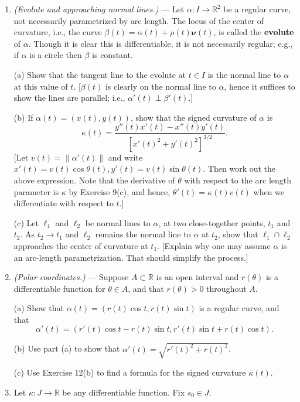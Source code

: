 \documentclass[leqno]{book}
\begin{document}
\begin{enumerate}
\item\emph{(Evolute and approaching normal lines.)} \---- Let $\alpha:I\to\mathbb R^2$ be a regular curve, not necessarily parametrized by arc length.  The locus of the center of curvature, i.e., the curve $\beta(t)=\alpha(t)+\rho(t)\boldsymbol\nu(t)$, is called the \textbf{evolute} of $\alpha$.  Though it is clear this is differentiable, it is not necessarily regular; e.g., if $\alpha$ is a circle then $\beta$ is constant. %

(a) Show that the tangent line to the evolute at $t\in I$ is the normal line to $\alpha$ at this value of $t$.  [$\beta(t)$ is clearly on the normal line to $\alpha$, hence it suffices to show the lines are parallel; i.e., $\alpha'(t)\perp\beta'(t)$.]

(b) If $\alpha(t)=(x(t),y(t))$, show that the signed curvature of $\alpha$ is
$$\kappa(t)=\frac{y''(t)x'(t)-x''(t)y'(t)}{[x'(t)^2+y'(t)^2]^{3/2}}.$$
[Let $v(t)=\|\alpha'(t)\|$ and write $x'(t)=v(t)\cos\theta(t),y'(t)=v(t)\sin\theta(t)$.  Then work out the above expression.  Note that the derivative of $\theta$ with respect to the arc length parameter is $\kappa$ by Exercise 9(c), and hence, $\theta'(t)=\kappa(t)v(t)$ when we differentiate with respect to $t$.]

(c) Let $\ell_1$ and $\ell_2$ be normal lines to $\alpha$, at two close-together points, $t_1$ and $t_2$.  As $t_2\to t_1$ and $\ell_2$ remains the normal line to $\alpha$ at $t_2$, show that $\ell_1\cap\ell_2$ approaches the center of curvature at $t_1$.  [Explain why one may assume $\alpha$ is an arc-length parametrization.  That should simplify the process.]

\item\emph{(Polar coordinates.)} \---- Suppose $A\subset\mathbb R$ is an open interval and $r(\theta)$ is a differentiable function for $\theta\in A$, and that $r(\theta)>0$ throughout $A$.

(a) Show that $\alpha(t)=(r(t)\cos t,r(t)\sin t)$ is a regular curve, and that
$$\alpha'(t)=(r'(t)\cos t-r(t)\sin t,r'(t)\sin t+r(t)\cos t).$$

(b) Use part (a) to show that $\alpha'(t)=\sqrt{r'(t)^2+r(t)^2}$.

(c) Use Exercise 12(b) to find a formula for the signed curvature $\kappa(t)$.

\item Let $\kappa:J\to\mathbb R$ be any differentiable function.  Fix $s_0\in J$.


\end{enumerate}
\end{document}
